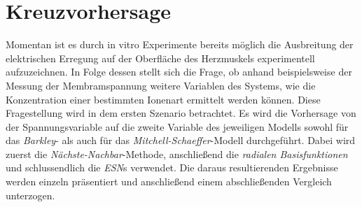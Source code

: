 \section{Kreuzvorhersage}
\label{sec:exp_cross_pred}
Momentan ist es durch in vitro Experimente bereits möglich die Ausbreitung der elektrischen Erregung auf der Oberfläche des Herzmuskels experimentell aufzuzeichnen. In Folge dessen stellt sich die Frage, ob anhand beispielsweise der Messung der Membramspannung weitere Variablen des Systems, wie die Konzentration einer bestimmten Ionenart ermittelt werden können. Diese Fragestellung wird in dem ersten Szenario betrachtet. Es wird die Vorhersage von der Spannungsvariable auf die zweite Variable des jeweiligen Modells sowohl für das \textit{Barkley}- als auch für das \textit{Mitchell-Schaeffer}-Modell durchgeführt. Dabei wird zuerst die \textit{Nächste-Nachbar}-Methode, anschließend die \textit{radialen Basisfunktionen} und schlussendlich die \textit{ESN}s verwendet. Die daraus resultierenden Ergebnisse werden einzeln präsentiert und anschließend einem abschließenden Vergleich unterzogen.
 

